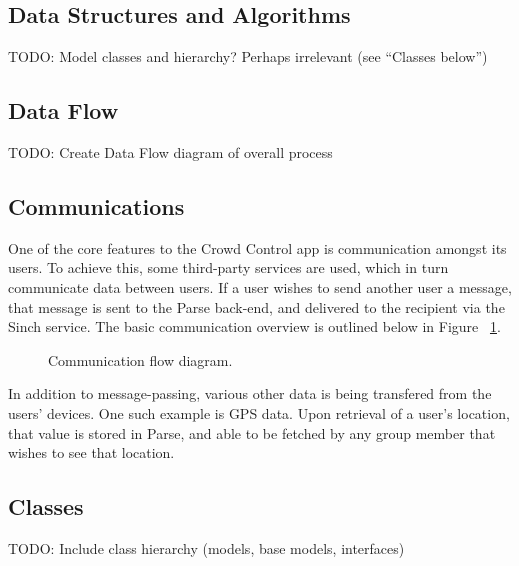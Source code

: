  \subsection{Data Structures and Algorithms}
 TODO: Model classes and hierarchy? Perhaps irrelevant (see ``Classes below'')
 
 \subsection{Data Flow}
 TODO: Create Data Flow diagram of overall process
 
 
 \subsection{Communications}
 One of the core features to the Crowd Control app is communication amongst its users. To achieve this, some third-party services are used, which in turn communicate data between users. If a user wishes to send another user a message, that message is sent to the Parse back-end, and delivered to the recipient via the Sinch service. The basic communication overview is outlined below in Figure ~\ref{CommFlow}.
 
  	\begin{figure}[tbh]
	\begin{center}
	\end{center}
	\caption{Communication flow diagram. \label{CommFlow}}
	\end{figure}
 
 In addition to message-passing, various other data is being transfered from the users' devices. One such example is GPS data. Upon retrieval of a user's location, that value is stored in Parse, and able to be fetched by any group member that wishes to see that location. 

 \subsection{Classes}
 TODO: Include class hierarchy (models, base models, interfaces)
